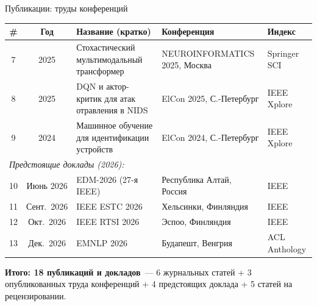 \documentclass[10pt,aspectratio=169]{beamer}
\begin{document}
\begin{frame}{Публикации: труды конференций}
\scriptsize
\begin{tabular}{cclll}
\toprule
\# & Год & Название (кратко) & Конференция & Индекс \\
\midrule
7 & 2025 & Стохастический мультимодальный трансформер & NEUROINFORMATICS 2025, Москва & Springer SCI \\
8 & 2025 & DQN и актор-критик для атак отравления в NIDS & ElCon 2025, С.-Петербург & IEEE Xplore \\
9 & 2024 & Машинное обучение для идентификации устройств & ElCon 2024, С.-Петербург & IEEE Xplore \\
\midrule
\multicolumn{5}{l}{\textit{Предстоящие доклады (2026):}} \\
10 & Июнь 2026 & EDM-2026 (27-я IEEE) & Республика Алтай, Россия & IEEE \\
11 & Сент.\ 2026 & IEEE ESTC 2026 & Хельсинки, Финляндия & IEEE \\
12 & Окт.\ 2026 & IEEE RTSI 2026 & Эспоо, Финляндия & IEEE \\
13 & Дек.\ 2026 & EMNLP 2026 & Будапешт, Венгрия & ACL Anthology \\
\bottomrule
\end{tabular}
\medskip
\begin{block}{}
\small\textbf{Итого: 18 публикаций и докладов}~---
6 журнальных статей + 3 опубликованных труда конференций +
4 предстоящих доклада + 5 статей на рецензировании.
\end{block}
\end{frame}
\end{document}
